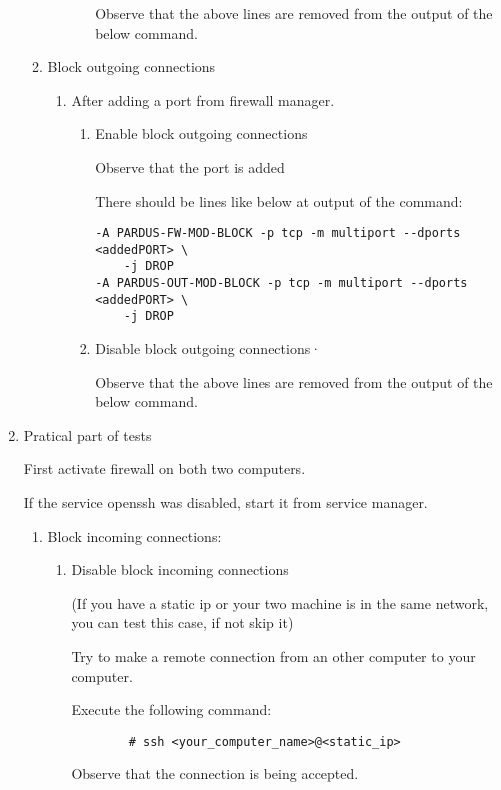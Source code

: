 \documentclass[a4paper,10pt]{article}
\begin{document}
\begin{enumerate}
\begin{enumerate}
\begin{enumerate}
\begin{enumerate}
    	Observe that the above lines are removed from the output of the below command.
        \end{enumerate}
    \end{enumerate}

\item Block outgoing connections 
\begin{enumerate}
    \item After adding a port from firewall manager.
        \begin{enumerate}
        \item Enable block outgoing connections

            Observe that the port is added

            There should be lines like below at output of the command:

\begin{verbatim}
-A PARDUS-FW-MOD-BLOCK -p tcp -m multiport --dports <addedPORT> \
    -j DROP
-A PARDUS-OUT-MOD-BLOCK -p tcp -m multiport --dports <addedPORT> \
    -j DROP
\end{verbatim} 

        \item Disable block outgoing connections·

              Observe that the above lines are removed from the output of the below command.
        \end{enumerate}
    \end{enumerate}
\end{enumerate}
\item Pratical part of tests

	First activate firewall on both two computers.	

    	If the service openssh was disabled, start it from service manager.
\begin{enumerate}
    \item Block incoming connections: 

	
	
    \begin{enumerate}
        \item Disable block incoming connections

		(If you have a static ip or your two machine is in the same network, you can test this case, if not skip it)

              Try to make a remote connection from an other computer to your computer.

              Execute the following command:
		\begin{verbatim}
		# ssh <your_computer_name>@<static_ip>
		\end{verbatim} 
              Observe that the connection is being accepted.


\end{enumerate}
\end{enumerate}
\end{enumerate}
\end{document}
